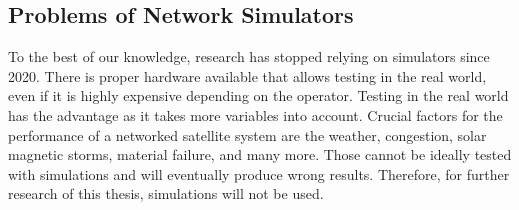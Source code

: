 \subsection{Problems of Network Simulators}

To the best of our knowledge, research has stopped relying on simulators since
2020. There is proper hardware available that allows testing in the real world,
even if it is highly expensive depending on the operator. Testing in the real
world has the advantage as it takes more variables into account. Crucial
factors for the performance of a networked satellite system are the weather,
congestion, solar magnetic storms, material failure, and many more. Those
cannot be ideally tested with simulations and will eventually produce wrong
results. Therefore, for further research of this thesis, simulations will not
be used.
